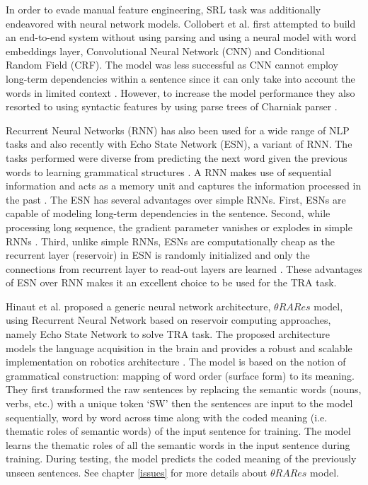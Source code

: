 In order to evade manual feature engineering, SRL task was additionally endeavored with neural network models. Collobert et al. \cite{srl:collobert:2011} first attempted to build an end-to-end system without using parsing and using a neural model with word embeddings layer, Convolutional Neural Network (CNN) and Conditional Random Field (CRF). The model was less successful as CNN cannot employ long-term dependencies within a sentence since it can only take into account the words in limited context \cite{end-to-end}. However, to increase the model performance they also resorted to using syntactic features by using parse trees of Charniak parser \cite{charniak_parser:2000}.

Recurrent Neural Networks (RNN) has also been used for a wide range of NLP tasks and also recently with Echo State Network (ESN), a variant of RNN. The tasks performed were diverse from predicting the next word given the previous words to learning grammatical structures \cite{esn:learn_gs}. A RNN makes use of sequential information and acts as a memory unit and captures the information processed in the past \cite{rnn:elman:1990}. The ESN has several advantages over simple RNNs. First, ESNs are capable of modeling long-term dependencies in the sentence. Second, while processing long sequence, the gradient parameter vanishes or explodes in simple RNNs \cite{rnn:gradiant_problem:bengio}. Third, unlike simple RNNs, ESNs are computationally cheap as the recurrent layer (reservoir) in ESN is randomly initialized and only the connections from recurrent layer to read-out layers are learned \cite{esn:NIPS:2003, esn:practical_guide}. These advantages of ESN over RNN makes it an excellent choice to be used for the TRA task.

Hinaut et al. \cite{xavier:2013:RT} proposed a generic neural network architecture, $\theta RARes$ model, using Recurrent Neural Network based on reservoir computing approaches, namely Echo State Network to solve TRA task. The proposed architecture models the language acquisition in the brain and provides a robust and scalable implementation on robotics architecture \cite{xavier:2013:RT,tra:xavier_hri}.  The model is based on the notion of grammatical construction: mapping of word order (surface form) to its meaning. They first transformed the raw sentences by replacing the semantic words (nouns, verbs, etc.) with a unique token `SW' then the sentences are input to the model sequentially, word by word across time along with the coded meaning (i.e. thematic roles of semantic words) of the input sentence for training. The model learns the thematic roles of all the semantic words in the input sentence during training. During testing, the model predicts the coded meaning of the previously unseen sentences. See chapter \ref{issues} for more details about $\theta RARes$ model.

